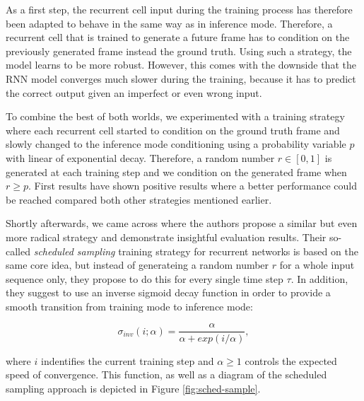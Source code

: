 As a first step, the recurrent cell input during the training process has therefore been adapted to behave in the same way as in inference mode. Therefore, a recurrent cell that is trained to generate a future frame has to condition on the previously generated frame instead the ground truth. Using such a strategy, the model learns to be more robust. However, this comes with the downside that the RNN model converges much slower during the training, because it has to predict the correct output given an imperfect or even wrong input.

To combine the best of both worlds, we experimented with a training strategy where each recurrent cell started to condition on the ground truth frame and slowly changed to the inference mode conditioning using a probability variable $p$ with linear of exponential decay. Therefore, a random number $r \in [0, 1]$ is generated at each training step and we condition on the generated frame when $r \geq p$. First results have shown positive results where a better performance could be reached compared both other strategies mentioned earlier. 

Shortly afterwards, we came across \parencite{sched_sample} where the authors propose a similar but even more radical strategy and demonstrate insightful evaluation results. Their so-called \textit{scheduled sampling} training strategy for recurrent networks is based on the same core idea, but instead of generateing a random number $r$ for a whole input sequence only, they propose to do this for every single time step $\tau$. In addition, they suggest to use an inverse sigmoid decay function in order to provide a smooth transition from training mode to inference mode:

\begin{equation} \label{eq:inverse-sigmoid}
\sigma_{inv}(i; \alpha) = \frac{\alpha}{\alpha + exp(i / \alpha)} ,
\end{equation}

where $i$ indentifies the current training step and $\alpha \geq 1$ controls the expected speed of convergence. This function, as well as a diagram of the scheduled sampling approach is depicted in Figure \ref{fig:sched-sample}.

